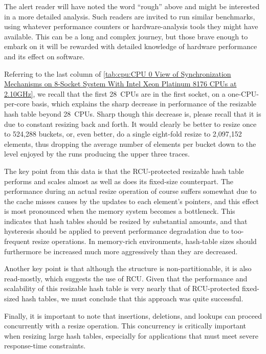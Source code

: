 {	The alert reader will have noted the word ``rough'' above
	and might be interested in a more detailed analysis.
	Such readers are invited to run similar benchmarks, using
	whatever performance counters or hardware-analysis tools
	they might have available.
	This can be a long and complex journey, but those brave enough
	to embark on it will be rewarded with detailed knowledge of
	hardware performance and its effect on software.
}\QuickQuizEnd

Referring to the last column of
\cref{tab:cpu:CPU 0 View of Synchronization Mechanisms on 8-Socket System With Intel Xeon Platinum 8176 CPUs at 2.10GHz},
we recall that the first 28~CPUs are in the first socket, on a
one-CPU-per-core basis, which explains the sharp decrease in performance
of the resizable hash table beyond 28~CPUs.
Sharp though this decrease is, please recall that it is due to constant
resizing back and forth.
It would clearly be better to resize once to 524,288 buckets,
or, even better, do a single eight-fold resize to 2,097,152 elements,
thus dropping the average number of elements per bucket down to the
level enjoyed by the runs producing the upper three traces.

The key point from this data is that the RCU-protected resizable hash
table performs and scales almost as well as does its fixed-size counterpart.
The performance during an actual resize operation of course suffers
somewhat due to the cache misses causes by the updates to each element's
pointers, and this effect is most pronounced when the memory system
becomes a bottleneck.
This indicates that hash tables should be resized by substantial amounts,
and that hysteresis should be applied to prevent performance degradation
due to too-frequent resize operations.
In memory-rich environments, hash-table sizes should furthermore
be increased much more aggressively than they are decreased.

Another key point is that although the  structure is
non-partitionable, it is also read-mostly, which suggests the use
of RCU\@.
Given that the performance and scalability of this resizable hash table is
very nearly that of RCU-protected fixed-sized hash tables, we must
conclude that this approach was quite successful.

Finally, it is important to note that insertions, deletions, and
lookups can proceed concurrently with a resize operation.
This concurrency is
critically important when resizing large hash tables, especially
for applications that must meet severe response-time constraints.

